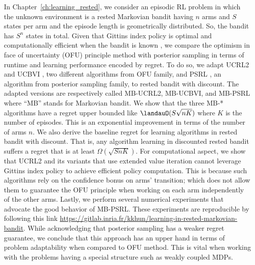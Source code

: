 In Chapter~\ref{ch:learning_rested}, we consider an episodic RL problem in which the unknown environment is a rested Markovian bandit having $n$ arms and $S$ states per arm and the episode length is geometrically distributed.
So, the bandit has $S^n$ states in total.
Given that Gittins index policy is optimal and computationally efficient when the bandit is known \cite{gittins1979bandit}, we compare the optimism in face of uncertainty (OFU) principle method with posterior sampling in terms of runtime and learning performance encoded by regret.
To do so, we adapt UCRL2 \cite{jaksch2010near} and UCBVI \cite{azar2017minimax}, two different algorithms from OFU family, and PSRL \cite{osband2013more}, an algorithm from posterior sampling family, to rested bandit with discount.
The adapted versions are respectively called MB-UCRL2, MB-UCBVI, and MB-PSRL where ``MB'' stands for Markovian bandit.
We show that the three MB-* algorithms have a regret upper bounded like $\landauO(S\sqrt{nK})$ where $K$ is the number of episodes.
This is an exponential improvement in terms of the number of arms $n$.
We also derive the baseline regret for learning algorithms in rested bandit with discount.
That is, any algorithm learning in discounted rested bandit suffers a regret that is at least $\Omega(\sqrt{SnK})$.
For computational aspect, we show that UCRL2 and its variants that use extended value iteration \cite{jaksch2010near} cannot leverage Gittins index policy to achieve efficient policy computation.
This is because such algorithms rely on the confidence bonus on arms' transition; which does not allow them to guarantee the OFU principle when working on each arm independently of the other arms.
Lastly, we perform several numerical experiments that advocate the good behavior of MB-PSRL.
These experiments are reproducible by following this link \url{https://gitlab.inria.fr/kkhun/learning-in-rested-markovian-bandit}.
While acknowledging that posterior sampling has a weaker regret guarantee, we conclude that this approach has an upper hand in terms of problem adaptability when compared to OFU method.
This is vital when working with the problems having a special structure such as weakly coupled MDPs.

